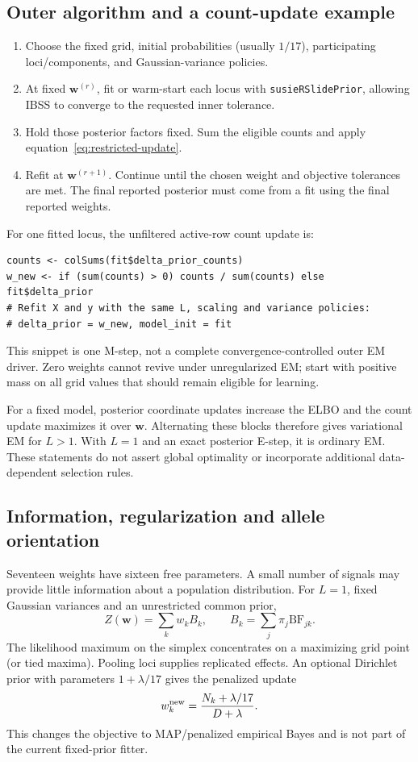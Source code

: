 \documentclass[11pt]{article}
\newcommand{\BF}{\mathrm{BF}}
\newcommand{\pkg}{\texttt{susieRSlidePrior}}
\begin{document}
\subsection{Outer algorithm and a count-update example}
\begin{enumerate}
 \item Choose the fixed grid, initial probabilities (usually $1/17$),
 participating loci/components, and Gaussian-variance policies.
 \item At fixed $\mathbf w^{(r)}$, fit or warm-start each locus with
 \pkg{}, allowing IBSS to converge to the requested inner tolerance.
 \item Hold those posterior factors fixed. Sum the eligible counts and
 apply equation~\eqref{eq:restricted-update}.
 \item Refit at $\mathbf w^{(r+1)}$. Continue until the chosen weight and
 objective tolerances are met. The final reported posterior must come
 from a fit using the final reported weights.
\end{enumerate}
For one fitted locus, the unfiltered active-row count update is:
\begin{verbatim}
counts <- colSums(fit$delta_prior_counts)
w_new <- if (sum(counts) > 0) counts / sum(counts) else fit$delta_prior
# Refit X and y with the same L, scaling and variance policies:
# delta_prior = w_new, model_init = fit
\end{verbatim}
This snippet is one M-step, not a complete convergence-controlled outer
EM driver. Zero weights cannot revive under unregularized EM; start with
positive mass on all grid values that should remain eligible for learning.

For a fixed model, posterior coordinate updates increase the ELBO and
the count update maximizes it over $\mathbf w$. Alternating these blocks
therefore gives variational EM for $L>1$. With $L=1$ and an exact posterior
E-step, it is ordinary EM. These statements do not assert global
optimality or incorporate additional data-dependent selection rules.

\subsection{Information, regularization and allele orientation}
Seventeen weights have sixteen free parameters. A small number of
signals may provide little information about a population distribution.
For $L=1$, fixed Gaussian variances and an unrestricted common prior,
\begin{equation}
 Z(\mathbf w)=\sum_kw_kB_k,\qquad B_k=\sum_j\pi_j\BF_{jk}.
\end{equation}
The likelihood maximum on the simplex concentrates on a maximizing grid
point (or tied maxima). Pooling loci supplies replicated effects.
An optional Dirichlet prior with parameters $1+\lambda/17$ gives the
penalized update
\begin{equation}
 w_k^{\rm new}=\frac{N_k+\lambda/17}{D+\lambda}.
\end{equation}
This changes the objective to MAP/penalized empirical Bayes and is not
part of the current fixed-prior fitter.
\end{document}
